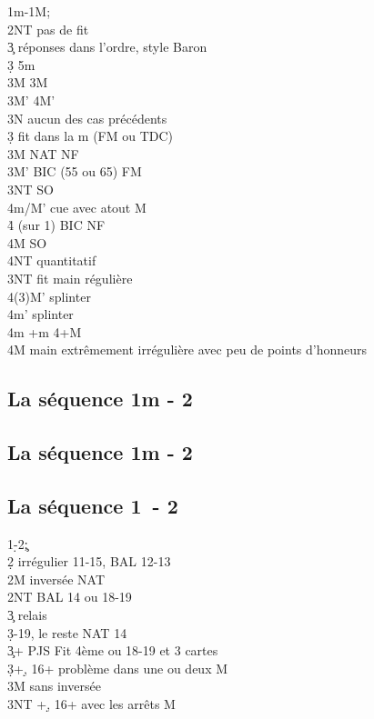 \documentclass[a4paper]{article}
\begin{document}
\begin{bidtable}
1m-1M;\\
2NT \> pas de fit\+\\
3\c \> réponses dans l'ordre, style Baron\+\\
3\d \> 5m\\
3M \> 3M\\
\>3M' 4M'\\
\>3N aucun des cas précédents\-\\
3\d \> fit dans la m (FM ou TDC)\\
3M \> NAT NF\\
3M' \> BIC (55 ou 65) FM\\
3NT \> SO\\
4m/M' \> cue avec atout M\\
4\h \> (sur 1\s ) BIC NF\\
4M \> SO\\
4NT \> quantitatif\-\\
3NT \> fit main régulière\\
4(3)M’ \> splinter\\
4m’ \> splinter\\
4m +m 4+M\\
4M \> main extrêmement irrégulière avec peu de points d’honneurs
\end{bidtable}

\subsection{La séquence 1m - 2\pdfh}

\subsection{La séquence 1m - 2\pdfs}

\subsection{La séquence 1\pdfd\ - 2\pdfc}

\begin{bidtable}
1\d-2\c;\\
2\d \> irrégulier 11-15, BAL 12-13\\
2M \> inversée NAT\\
2NT \> BAL 14 ou 18-19\+\\
3\c \> relais\+\\
3\d {}-19, le reste NAT 14\-\-\\
3\c {}+ PJS Fit 4ème ou 18-19 et 3 cartes\\
3\d {}+\d , 16+ problème dans une ou deux M\\
3M  sans inversée\\
3NT +\d , 16+ avec les arrêts M
\end{bidtable}
\end{document}
